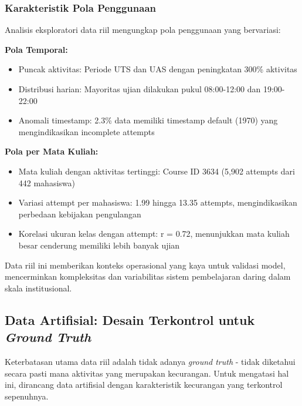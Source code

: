 \subsubsection{Karakteristik Pola Penggunaan}
\label{sec:karakteristikPolaPenggunaan}

Analisis eksploratori data riil mengungkap pola penggunaan yang bervariasi:

\textbf{Pola Temporal:}
\begin{itemize}
    \item Puncak aktivitas: Periode UTS dan UAS dengan peningkatan 300\% aktivitas
    \item Distribusi harian: Mayoritas ujian dilakukan pukul 08:00-12:00 dan 19:00-22:00
    \item Anomali timestamp: 2.3\% data memiliki timestamp default (1970) yang mengindikasikan incomplete attempts
\end{itemize}

\textbf{Pola per Mata Kuliah:}
\begin{itemize}
    \item Mata kuliah dengan aktivitas tertinggi: Course ID 3634 (5,902 attempts dari 442 mahasiswa)
    \item Variasi attempt per mahasiswa: 1.99 hingga 13.35 attempts, mengindikasikan perbedaan kebijakan pengulangan
    \item Korelasi ukuran kelas dengan attempt: r = 0.72, menunjukkan mata kuliah besar cenderung memiliki lebih banyak ujian
\end{itemize}

Data riil ini memberikan konteks operasional yang kaya untuk validasi model, mencerminkan kompleksitas dan variabilitas sistem pembelajaran daring dalam skala institusional.

\subsection{Data Artifisial: Desain Terkontrol untuk \textit{Ground Truth}}
\label{sec:dataArtifisial}

Keterbatasan utama data riil adalah tidak adanya \textit{ground truth} - tidak diketahui secara pasti mana aktivitas yang merupakan kecurangan. Untuk mengatasi hal ini, dirancang data artifisial dengan karakteristik kecurangan yang terkontrol sepenuhnya.

